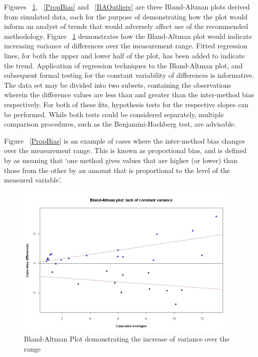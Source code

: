 \documentclass[12pt, a4paper]{report}
\theoremstyle{plain}
\theoremstyle{definition}
\theoremstyle{remark}
\begin{document}
	Figures ~\ref{BAFanEffect}, ~\ref{PropBias} and ~\ref{BAOutliers} are three Bland-Altman plots derived from
	simulated data, each for the purpose of demonstrating how the plot would inform an analyst of trends that would adversely affect use of the recommended methodology. Figure ~\ref{BAFanEffect} demonstrates how the Bland-Altman plot would indicate
	increasing variance of differences over the measurement range.
	Fitted regression lines, for both the upper and lower half of the
	plot, has been added to indicate the trend. Application of regression techniques to the Bland-Altman plot, and subsequent formal testing for the constant variability of differences is informative. The data set may be divided into two subsets, containing the observations wherein the difference values are less than and greater than the inter-method bias respectively. For both of these fits, hypothesis tests for the respective slopes can be performed. While both tests could be considered separately, multiple comparison procedures, such as the Benjamini-Hochberg \citep{BH} test, are advisable.
	
	Figure ~\ref{PropBias} is an example
	of cases where the inter-method bias changes over the measurement range. This is known as proportional bias, and is defined by \citet{ludbrook97} as meaning that `one method gives
	values that are higher (or lower) than those from the other by an
	amount that is proportional to the level of the measured variable'.
	
	\begin{figure}[h!]
		\begin{center}
			\includegraphics[width=110mm]{images/BAFanEffect.jpeg}
			\caption{Bland-Altman Plot demonstrating the increase of variance over the range}\label{BAFanEffect}
		\end{center}
	\end{figure}
	
\end{document}
